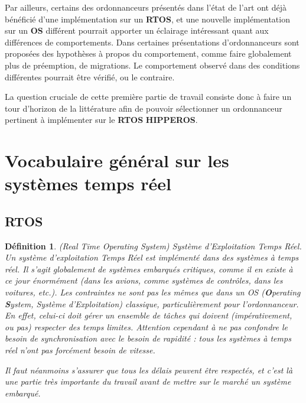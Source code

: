 \documentclass[11pt,a4paper,oneside]{report}
\newtheorem{mydef}{Définition}
\begin{document}
Par ailleurs, certains des ordonnanceurs présentés dans l'état de l'art 
 ont déjà bénéficié d'une implémentation sur un \textbf{RTOS}, et une nouvelle 
 implémentation sur un \textbf{OS} différent pourrait apporter un éclairage intéressant quant 
 aux différences de comportements.
Dans certaines présentations d'ordonnanceurs sont proposées des hypothèses à propos du comportement, 
comme faire globalement plus de préemption, de migrations. 
Le comportement observé dans des conditions différentes pourrait être vérifié, ou le contraire.

La question cruciale de cette première partie de travail 
consiste donc à faire un tour d'horizon de la littérature afin de pouvoir 
sélectionner un ordonnanceur pertinent à implémenter sur le \textbf{RTOS} \textbf{HIPPEROS}.

\section{Vocabulaire général sur les systèmes temps réel}

\subsection{RTOS}
\begin{mydef}
(Real Time Operating System) Système d'Exploitation Temps Réel.\\
Un système d'exploitation Temps Réel est implémenté dans des systèmes à temps réel. 
Il s'agit globalement de systèmes embarqués critiques, comme il en existe à ce jour 
énormément (dans les avions, comme systèmes de contrôles, dans les voitures, etc.).
Les contraintes ne sont pas les mêmes que dans un OS (\textbf{O}perating \textbf{S}ystem, Système d'Exploitation) classique, particulièrement pour
l'ordonnanceur. 
En effet, celui-ci doit gérer un ensemble de tâches qui doivent 
(impérativement, ou pas) respecter des temps limites. 
Attention cependant à ne pas confondre le besoin de synchronisation avec le besoin de rapidité : 
tous les systèmes à temps réel n'ont pas forcément besoin de vitesse. 

Il faut néanmoins s'assurer que tous les délais peuvent être respectés, et 
c'est là une partie très importante du travail avant de mettre sur le 
marché un système embarqué.\\

\end{mydef}
	
\end{document}
